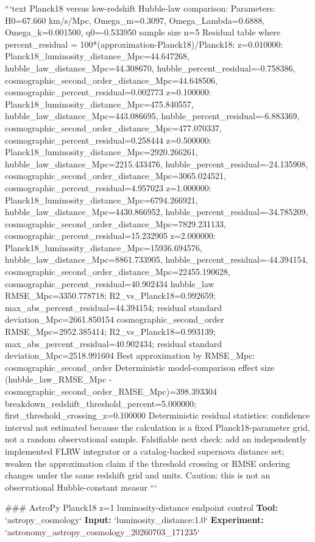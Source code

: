 \documentclass[11pt,a4paper]{article}
\begin{document}
```text
Planck18 versus low-redshift Hubble-law comparison:
  Parameters: H0=67.660 km/s/Mpc, Omega\_m=0.3097, Omega\_Lambda=0.6888, Omega\_k=0.001500, q0=-0.533950
  sample size n=5
  Residual table where percent\_residual = 100*(approximation-Planck18)/Planck18:
    z=0.010000: Planck18\_luminosity\_distance\_Mpc=44.647268, hubble\_law\_distance\_Mpc=44.308670, hubble\_percent\_residual=-0.758386, cosmographic\_second\_order\_distance\_Mpc=44.648506, cosmographic\_percent\_residual=0.002773
    z=0.100000: Planck18\_luminosity\_distance\_Mpc=475.840557, hubble\_law\_distance\_Mpc=443.086695, hubble\_percent\_residual=-6.883369, cosmographic\_second\_order\_distance\_Mpc=477.070337, cosmographic\_percent\_residual=0.258444
    z=0.500000: Planck18\_luminosity\_distance\_Mpc=2920.266261, hubble\_law\_distance\_Mpc=2215.433476, hubble\_percent\_residual=-24.135908, cosmographic\_second\_order\_distance\_Mpc=3065.024521, cosmographic\_percent\_residual=4.957023
    z=1.000000: Planck18\_luminosity\_distance\_Mpc=6794.266921, hubble\_law\_distance\_Mpc=4430.866952, hubble\_percent\_residual=-34.785209, cosmographic\_second\_order\_distance\_Mpc=7829.231133, cosmographic\_percent\_residual=15.232905
    z=2.000000: Planck18\_luminosity\_distance\_Mpc=15936.694576, hubble\_law\_distance\_Mpc=8861.733905, hubble\_percent\_residual=-44.394154, cosmographic\_second\_order\_distance\_Mpc=22455.190628, cosmographic\_percent\_residual=40.902434
  hubble\_law RMSE\_Mpc=3350.778718; R2\_vs\_Planck18=0.992659; max\_abs\_percent\_residual=44.394154; residual standard deviation\_Mpc=2661.850154
  cosmographic\_second\_order RMSE\_Mpc=2952.385414; R2\_vs\_Planck18=0.993139; max\_abs\_percent\_residual=40.902434; residual standard deviation\_Mpc=2518.991604
  Best approximation by RMSE\_Mpc: cosmographic\_second\_order
  Deterministic model-comparison effect size (hubble\_law\_RMSE\_Mpc - cosmographic\_second\_order\_RMSE\_Mpc)=398.393304
  breakdown\_redshift\_threshold\_percent=5.000000; first\_threshold\_crossing\_z=0.100000
  Deterministic residual statistics: confidence interval not estimated because the calculation is a fixed Planck18-parameter grid, not a random observational sample.
  Falsifiable next check: add an independently implemented FLRW integrator or a catalog-backed supernova distance set; weaken the approximation claim if the threshold crossing or RMSE ordering changes under the same redshift grid and units.
  Caution: this is not an observational Hubble-constant measur
```

\#\#\# AstroPy Planck18 z=1 luminosity-distance endpoint control
\textbf{Tool:} `astropy\_cosmology`
\textbf{Input:} `luminosity\_distance:1.0`
\textbf{Experiment:} `astronomy\_astropy\_cosmology\_20260703\_171235`
\end{document}
